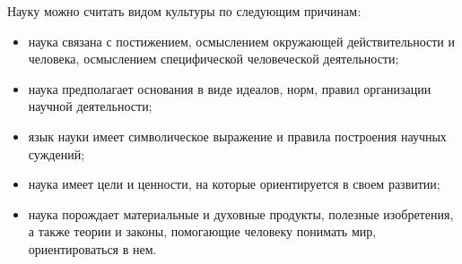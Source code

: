 




Науку можно считать видом культуры по следующим причинам:
\begin{itemize}
    \item наука связана с постижением, осмыслением окружающей действительности и человека, осмыслением специфической человеческой деятельности;
    \item наука предполагает основания в виде идеалов, норм, правил организации
    научной деятельности;
    \item язык науки имеет символическое выражение и правила построения научных суждений;
    \item наука имеет цели и ценности, на которые ориентируется в своем развитии;
    \item наука порождает материальные и духовные продукты, полезные изобретения, а также теории и законы, помогающие человеку понимать мир, ориентироваться в нем.
\end{itemize}


